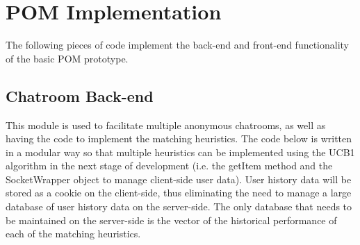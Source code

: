 \documentclass{article}
\begin{document}
\section{POM Implementation}

The following pieces of code implement the back-end and front-end functionality of the basic POM prototype. 

\subsection{Chatroom Back-end} 

This module is used to facilitate multiple anonymous chatrooms, as well as having the code to implement the matching heuristics. The code below is written in a modular way so that multiple heuristics can be implemented using the UCB1 algorithm in the next stage of development (i.e. the getItem method and the SocketWrapper object to manage client-side user data). User history data will be stored as a cookie on the client-side, thus eliminating the need to manage a large database of user history data on the server-side. The only database that needs to be maintained on the server-side is the vector of the historical performance of each of the matching heuristics.
\end{document}
